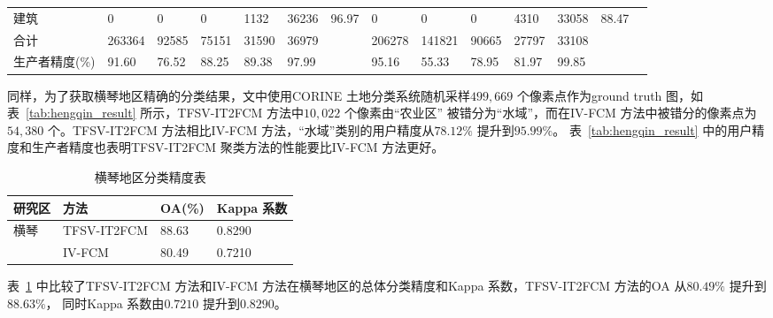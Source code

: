 \begin{table}[htbp]
\begin{adjustbox}{max width=1.05\textwidth}
\begin{tabular} {llllllllllllll}
            建筑                                          & 0                                        & 0                                                 & 0                          & 1132                                              & 36236 & 96.97 & 0      & 0      & 0     & 4310  & 33058 & 88.47 \\
            合计                                          & 263364                                   & 92585                                             & 75151                      & 31590                                             & 36979 &       & 206278 & 141821 & 90665 & 27797 & 33108 &       \\
            生产者精度(\%)                                & 91.60                                    & 76.52                                             & 88.25                      & 89.38                                             & 97.99 &       & 95.16  & 55.33  & 78.95 & 81.97 & 99.85 &       \\
            \bottomrule
        \end{tabular}
    \end{adjustbox}
\end{table}

同样，为了获取横琴地区精确的分类结果，文中使用CORINE 土地分类系统随机采样$499,669$ 个像素点作为ground truth 图，如表~\ref{tab:hengqin_result} 所示，TFSV-IT2FCM 方法中$10,022$ 个像素由“农业区” 被错分为“水域”，而在IV-FCM 方法中被错分的像素点为$54,380$ 个。TFSV-IT2FCM 方法相比IV-FCM 方法，“水域”类别的用户精度从$78.12\%$ 提升到$95.99\%$。 表~\ref{tab:hengqin_result} 中的用户精度和生产者精度也表明TFSV-IT2FCM 聚类方法的性能要比IV-FCM 方法更好。

\begin{table}[htbp]
    \caption{横琴地区分类精度表}\label{tab:hengqin_oa}
    \centering
    \footnotesize
    \begin{tabular}{llll}
        \toprule
        研究区 & 方法        & OA(\%) & Kappa 系数 \\
        \midrule
        横琴   & TFSV-IT2FCM & 88.63  & 0.8290     \\
               & IV-FCM      & 80.49  & 0.7210     \\
        \bottomrule
    \end{tabular}
\end{table}

表~\ref{tab:hengqin_oa} 中比较了TFSV-IT2FCM 方法和IV-FCM 方法在横琴地区的总体分类精度和Kappa 系数，TFSV-IT2FCM 方法的OA 从$80.49\%$ 提升到$88.63\%$， 同时Kappa 系数由$0.7210$ 提升到$0.8290$。


